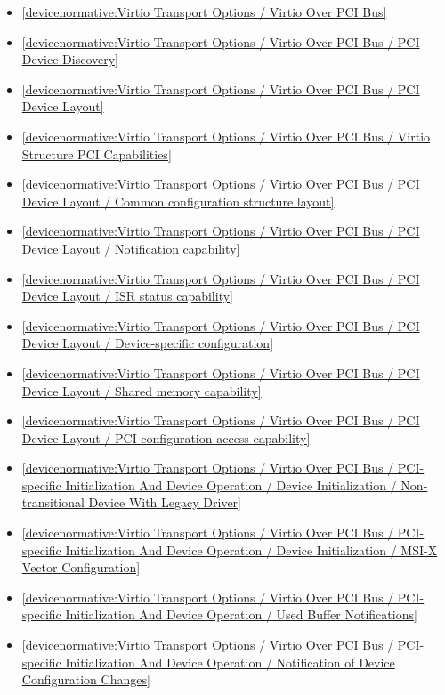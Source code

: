 \begin{itemize}
\item \ref{devicenormative:Virtio Transport Options / Virtio Over PCI Bus}
\item \ref{devicenormative:Virtio Transport Options / Virtio Over PCI Bus / PCI Device Discovery}
\item \ref{devicenormative:Virtio Transport Options / Virtio Over PCI Bus / PCI Device Layout}
\item \ref{devicenormative:Virtio Transport Options / Virtio Over PCI Bus / Virtio Structure PCI Capabilities}
\item \ref{devicenormative:Virtio Transport Options / Virtio Over PCI Bus / PCI Device Layout / Common configuration structure layout}
\item \ref{devicenormative:Virtio Transport Options / Virtio Over PCI Bus / PCI Device Layout / Notification capability}
\item \ref{devicenormative:Virtio Transport Options / Virtio Over PCI Bus / PCI Device Layout / ISR status capability}
\item \ref{devicenormative:Virtio Transport Options / Virtio Over PCI Bus / PCI Device Layout / Device-specific configuration}
\item \ref{devicenormative:Virtio Transport Options / Virtio Over PCI Bus / PCI Device Layout / Shared memory capability}
\item \ref{devicenormative:Virtio Transport Options / Virtio Over PCI Bus / PCI Device Layout / PCI configuration access capability}
\item \ref{devicenormative:Virtio Transport Options / Virtio Over PCI Bus / PCI-specific Initialization And Device Operation / Device Initialization / Non-transitional Device With Legacy Driver}
\item \ref{devicenormative:Virtio Transport Options / Virtio Over PCI Bus / PCI-specific Initialization And Device Operation / Device Initialization / MSI-X Vector Configuration}
\item \ref{devicenormative:Virtio Transport Options / Virtio Over PCI Bus / PCI-specific Initialization And Device Operation / Used Buffer Notifications}
\item \ref{devicenormative:Virtio Transport Options / Virtio Over PCI Bus / PCI-specific Initialization And Device Operation / Notification of Device Configuration Changes}
\end{itemize}

\label{sec:Conformance / Device Conformance / MMIO Device Conformance}

